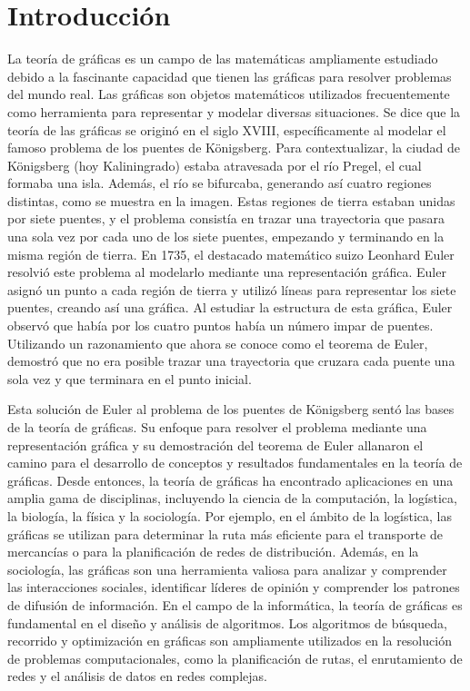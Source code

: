 \chapter{Introducci\'on}
La teoría de gráficas es un campo de las matemáticas ampliamente estudiado debido a la fascinante capacidad que tienen las gráficas para resolver problemas del mundo real. Las gráficas son objetos matemáticos utilizados frecuentemente como herramienta para representar y modelar diversas situaciones. Se dice que la teoría de las gráficas se originó en el siglo XVIII, específicamente al modelar el famoso problema de los puentes de Königsberg.
Para contextualizar, la ciudad de Königsberg (hoy Kaliningrado) estaba atravesada por el río Pregel, el cual formaba una isla. Además, el río se bifurcaba, generando así cuatro regiones distintas, como se muestra en la imagen. Estas regiones de tierra estaban unidas por siete puentes, y el problema consistía en trazar una trayectoria que pasara una sola vez por cada uno de los siete puentes, empezando y terminando en la misma región de tierra.
En 1735, el destacado matemático suizo Leonhard Euler resolvió este problema al modelarlo mediante una representación gráfica. Euler asignó un punto a cada región de tierra y utilizó líneas para representar los siete puentes, creando así una gráfica. Al estudiar la estructura de esta gráfica, Euler observó que había por los cuatro puntos había un número impar de puentes. Utilizando un razonamiento que ahora se conoce como el teorema de Euler, demostró que no era posible trazar una trayectoria que cruzara cada puente una sola vez y que terminara en el punto inicial.

Esta solución de Euler al problema de los puentes de Königsberg sentó las bases de la teoría de gráficas. Su enfoque para resolver el problema mediante una representación gráfica y su demostración del teorema de Euler allanaron el camino para el desarrollo de conceptos y resultados fundamentales en la teoría de gráficas. Desde entonces, la teoría de gráficas ha encontrado aplicaciones en una amplia gama de disciplinas, incluyendo la ciencia de la computación, la logística, la biología, la física y la sociología. Por ejemplo, en el ámbito de la logística, las gráficas se utilizan para determinar la ruta más eficiente para el transporte de mercancías o para la planificación de redes de distribución. Además, en la sociología, las gráficas son una herramienta valiosa para analizar y comprender las interacciones sociales, identificar líderes de opinión y comprender los patrones de difusión de información. En el campo de la informática, la teoría de gráficas es fundamental en el diseño y análisis de algoritmos. Los algoritmos de búsqueda, recorrido y optimización en gráficas son ampliamente utilizados en la resolución de problemas computacionales, como la planificación de rutas, el enrutamiento de redes y el análisis de datos en redes complejas.

